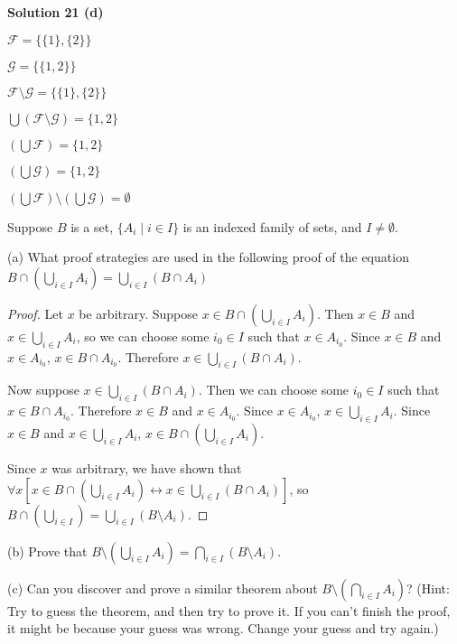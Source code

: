\textbf{Solution 21 (d)}

$\mathcal{F} = \{\{1\}, \{2\}\}$

$\mathcal{G} = \{\{1, 2\}\}$

$\mathcal{F} \setminus \mathcal{G} = \{\{1\}, \{2\}\}$

$\bigcup(\mathcal{F} \setminus \mathcal{G}) = \{1, 2\}$

$(\bigcup \mathcal{F}) = \{1, 2\}$

$(\bigcup \mathcal{G}) = \{1, 2\}$

$(\bigcup \mathcal{F}) \setminus (\bigcup \mathcal{G}) = \emptyset$

\begin{tcolorbox}[title=Problem 23, breakable]
    Suppose $B$ is a set, $\{A_i \mid i \in I\}$ is an indexed family of sets,
    and $I \not = \emptyset$.

    (a) What proof strategies are used in the following proof of the equation 
    $B \cap (\bigcup_{i \in I} A_i) = \bigcup_{i \in I}(B \cap A_i)$
    \begin{proof}
        Let $x$ be arbitrary. Suppose $x \in B \cap (\bigcup_{i \in I} A_i)$.
        Then $x \in B$ and $x \in \bigcup_{i \in I} A_i$, so we can choose some 
        $i_0 \in I$ such that $x \in A_{i_0}$. Since $x \in B$ and $x \in A_{i_0}$,
        $x \in B \cap A_{i_0}$. Therefore $x \in \bigcup_{i \in I} (B \cap A_i)$.

        Now suppose $x \in \bigcup_{i \in I} (B \cap A_i)$. Then we can choose some
        $i_0 \in I$ such that $x \in B \cap A_{i_0}$. Therefore $x \in B$ and $x \in
            A_{i_0}$. Since $x \in A_{i_0}$, $x \in \bigcup_{i \in I} A_i$. Since $x \in B$
        and $x \in \bigcup_{i \in I} A_i$, $x \in B \cap (\bigcup_{i \in I} A_i)$.

        Since $x$ was arbitrary, we have shown that $\forall{x}[x \in B \cap
                (\bigcup_{i \in I} A_i) \leftrightarrow x \in \bigcup_{i \in I}(B \cap A_i)]$,
        so $B \cap (\bigcup_{i \in I}) = \bigcup_{i \in I} (B \setminus A_i)$.
    \end{proof}
    (b) Prove that $B \setminus (\bigcup_{i \in I} A_i) = \bigcap_{i \in I} (B \setminus A_i)$.

    (c) Can you discover and prove a similar theorem about $B \setminus (\bigcap_{i \in I} A_i)$?
    (Hint: Try to guess the theorem, and then try to prove it. If you can't finish the proof,
    it might be because your guess was wrong. Change your guess and try again.)
\end{tcolorbox}

